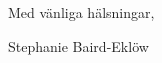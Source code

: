 \documentclass[11pt,a4paper,roman]{moderncv}        %
\begin{document}
Med v{\"a}nliga h{\"a}lsningar,


Stephanie Baird-Ekl{\"o}w


\end{document}
